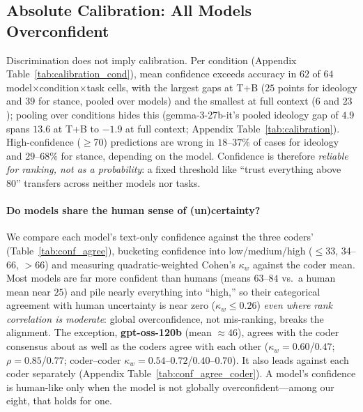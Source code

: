 \documentclass[11pt]{article}
\begin{document}
\subsection{Absolute Calibration: All Models Overconfident}
\label{sec:results_calibration}

Discrimination does not imply calibration. Per condition (Appendix Table~\ref{tab:calibration_cond}), mean confidence exceeds accuracy in $62$ of $64$ model$\times$condition$\times$task cells, with the largest gaps at T+B ($25$ points for ideology and $39$ for stance, pooled over models) and the smallest at full context ($6$ and $23$); pooling over conditions hides this (gemma-3-27b-it's pooled ideology gap of $4.9$ spans $13.6$ at T+B to $-1.9$ at full context; Appendix Table~\ref{tab:calibration}). High-confidence ($\ge$70) predictions are wrong in $18$--$37\%$ of cases for ideology and $29$--$68\%$ for stance, depending on the model. Confidence is therefore \emph{reliable for ranking, not as a probability}: a fixed threshold like ``trust everything above 80'' transfers across neither models nor tasks.

\paragraph{Do models share the human sense of (un)certainty?}
We compare each model's text-only confidence against the three coders' (Table~\ref{tab:conf_agree}), bucketing confidence into low/medium/high ($\le$33, 34--66, $>$66) and measuring quadratic-weighted Cohen's $\kappa_w$ against the coder mean. Most models are far more confident than humans (means $63$--$84$ vs.\ a human mean near $25$) and pile nearly everything into ``high,'' so their categorical agreement with human uncertainty is near zero ($\kappa_w \le 0.26$) \emph{even where rank correlation is moderate}: global overconfidence, not mis-ranking, breaks the alignment. The exception, \textbf{gpt-oss-120b} (mean ${\approx}46$), agrees with the coder consensus about as well as the coders agree with each other ($\kappa_w{=}0.60$/$0.47$; $\rho{=}0.85$/$0.77$; coder--coder $\kappa_w{=}0.54$--$0.72$/$0.40$--$0.70$). It also leads against each coder separately (Appendix Table~\ref{tab:conf_agree_coder}). A model's confidence is human-like only when the model is not globally overconfident---among our eight, that holds for one.
\end{document}
